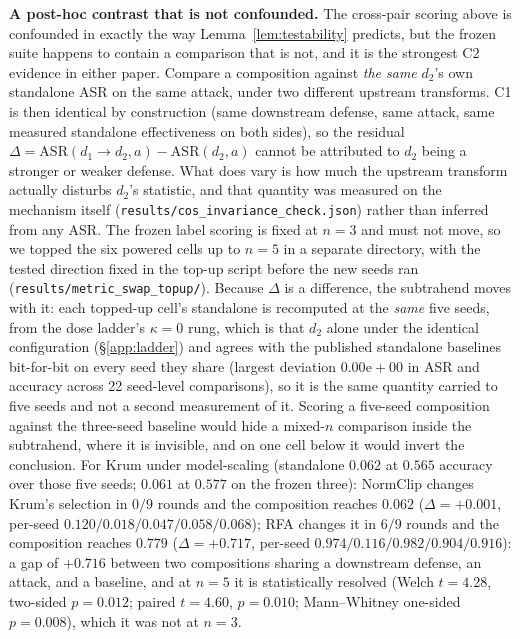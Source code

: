 \documentclass{article}
\begin{document}
\textbf{A post-hoc contrast that is not confounded.} The cross-pair scoring above is confounded in exactly the way Lemma~\ref{lem:testability} predicts, but the frozen suite happens to contain a comparison that is not, and it is the strongest C2 evidence in either paper. Compare a composition against \emph{the same} $d_2$'s own standalone ASR on the same attack, under two different upstream transforms. C1 is then identical by construction (same downstream defense, same attack, same measured standalone effectiveness on both sides), so the residual $\Delta = \mathrm{ASR}(d_1{\to}d_2, a) - \mathrm{ASR}(d_2, a)$ cannot be attributed to $d_2$ being a stronger or weaker defense. What does vary is how much the upstream transform actually disturbs $d_2$'s statistic, and that quantity was measured on the mechanism itself (\texttt{results/cos\_invariance\_check.json}) rather than inferred from any ASR. The frozen label scoring is fixed at $n{=}3$ and must not move, so we topped the six powered cells up to $n{=}5$ in a separate directory, with the tested direction fixed in the top-up script before the new seeds ran (\texttt{results/metric\_swap\_topup/}). Because $\Delta$ is a difference, the subtrahend moves with it: each topped-up cell's standalone is recomputed at the \emph{same} five seeds, from the dose ladder's $\kappa{=}0$ rung, which is that $d_2$ alone under the identical configuration (§\ref{app:ladder}) and agrees with the published standalone baselines bit-for-bit on every seed they share (largest deviation $0.00\mathrm{e}{+}00$ in ASR and accuracy across 22 seed-level comparisons), so it is the same quantity carried to five seeds and not a second measurement of it. Scoring a five-seed composition against the three-seed baseline would hide a mixed-$n$ comparison inside the subtrahend, where it is invisible, and on one cell below it would invert the conclusion. For Krum under model-scaling (standalone $0.062$ at $0.565$ accuracy over those five seeds; $0.061$ at $0.577$ on the frozen three): NormClip changes Krum's selection in $0/9$ rounds and the composition reaches $0.062$ ($\Delta = +0.001$, per-seed $0.120 / 0.018 / 0.047 / 0.058 / 0.068$); RFA changes it in $6/9$ rounds and the composition reaches $0.779$ ($\Delta = +0.717$, per-seed $0.974 / 0.116 / 0.982 / 0.904 / 0.916$): a gap of $+0.716$ between two compositions sharing a downstream defense, an attack, and a baseline, and at $n{=}5$ it is statistically resolved (Welch $t = 4.28$, two-sided $p = 0.012$; paired $t = 4.60$, $p = 0.010$; Mann--Whitney one-sided $p = 0.008$), which it was not at $n{=}3$.
\end{document}
